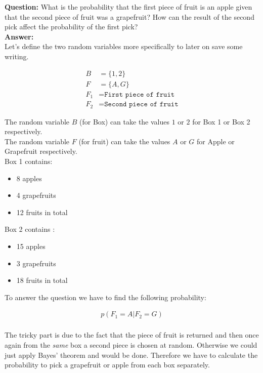 \documentclass[a4paper]{article}
\begin{document}
\textbf{Question:} What is the probability that the first piece of fruit is an apple given that the second piece of fruit was a grapefruit? How can the result of the second pick affect the probability of the first pick?\\

\textbf{Answer:}\\

Let's define the two random variables more specifically to later on save some writing. 

\begin{align*}
	B &= \{ 1,2\}\\
	F &= \{ A,G \}\\
	F_1 &= \texttt{First piece of fruit}\\
	F_2 &= \texttt{Second piece of fruit}
\end{align*}

The random variable $B$ (for Box) can take the values $1$ or $2$ for Box 1 or Box 2 respectively.\\
The random variable $F$ (for fruit) can take the values $A$ or $G$ for Apple or Grapefruit respectively.\\ 

Box 1 contains:

\begin{itemize}
	\item 8 apples
	\item 4 grapefruits
	\item 12 fruits in total
\end{itemize}

Box 2 contains :

\begin{itemize}
	\item 15 apples
	\item 3 grapefruits
	\item 18 fruits in total
\end{itemize}

To answer the question we have to find the following probability:

\begin{align*}
	p(F_1 = A | F_2 = G)\\	
\end{align*}



The tricky part is due to the fact that the piece of fruit is returned and then once again from the \textit{same} box a second piece is chosen at random. Otherwise we could just apply Bayes' theorem and would be done. Therefore we have to calculate the probability to pick a grapefruit or apple from each box separately.
\end{document}
